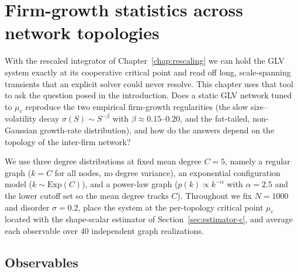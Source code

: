 \chapter{Firm-growth statistics across network topologies}
\label{chap:results}

With the rescaled integrator of Chapter~\ref{chap:rescaling} we can hold the GLV
system exactly at its cooperative critical point and read off long, scale-spanning
transients that an explicit solver could never resolve. This chapter uses that tool
to ask the question posed in the introduction. Does a static GLV network tuned to
$\mu_c$ reproduce the two empirical firm-growth regularities (the slow
size--volatility decay $\sigma(S)\sim S^{-\beta}$ with $\beta\approx0.15$--$0.20$, and
the fat-tailed, non-Gaussian growth-rate distribution), and how do the answers depend
on the topology of the inter-firm network?

We use three degree distributions at fixed mean degree $C=5$, namely a regular graph
($k=C$ for all nodes, no degree variance), an exponential configuration model
($k\sim\mathrm{Exp}(C)$), and a power-law graph ($p(k)\propto k^{-\alpha}$ with
$\alpha=2.5$ and the lower cutoff set so the mean degree tracks $C$). Throughout we fix
$N=1000$ and disorder $\sigma=0.2$, place the system at the per-topology critical point
$\mu_c$ located with the shape-scalar estimator of Section~\ref{sec:estimator-c}, and
average each observable over $40$ independent graph realizations.

\section{Observables}
\label{sec:observables}

